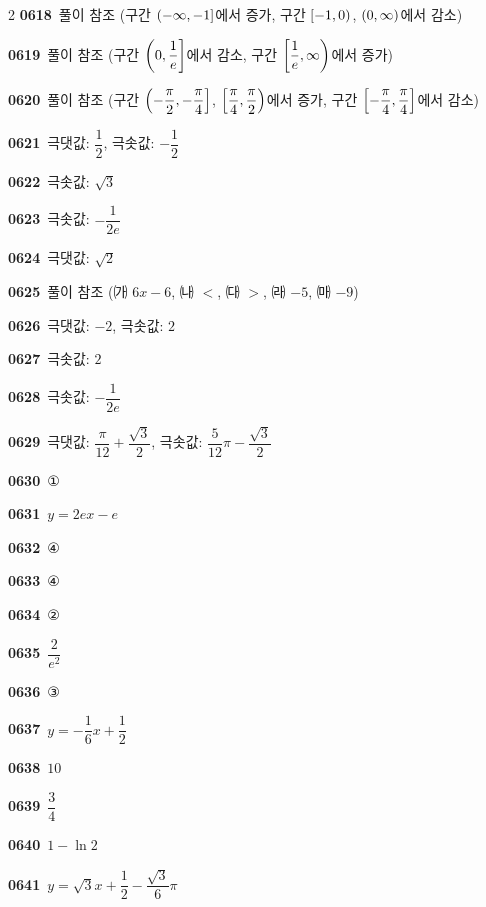 \documentclass[10pt,a4paper]{article}
\begin{document}
\begin{multicols}{2}
\noindent\textbf{0618}\ 풀이 참조 (구간 $(-\infty{,}\mkern3mu\mathopen{}-1]$에서 증가, 구간 $[-1{,}\mkern3mu\mathopen{}0)$, $(0{,}\mkern3mu\mathopen{}\infty)$에서 감소)\par
\noindent\textbf{0619}\ 풀이 참조 (구간 $\left(0{,}\mkern3mu\mathopen{}\dfrac{1}{e}\right]$에서 감소, 구간 $\left[\dfrac{1}{e}{,}\mkern3mu\mathopen{}\infty\right)$에서 증가)\par
\noindent\textbf{0620}\ 풀이 참조 (구간 $\left(-\dfrac{\pi}{2}{,}\mkern3mu\mathopen{}-\dfrac{\pi}{4}\right]$, $\left[\dfrac{\pi}{4}{,}\mkern3mu\mathopen{}\dfrac{\pi}{2}\right)$에서 증가, 구간 $\left[-\dfrac{\pi}{4}{,}\mkern3mu\mathopen{}\dfrac{\pi}{4}\right]$에서 감소)\par
\noindent\textbf{0621}\ 극댓값: $\dfrac{1}{2}$, 극솟값: $-\dfrac{1}{2}$\par
\noindent\textbf{0622}\ 극솟값: $\sqrt{3}$\par
\noindent\textbf{0623}\ 극솟값: $-\dfrac{1}{2e}$\par
\noindent\textbf{0624}\ 극댓값: $\sqrt{2}$\par
\noindent\textbf{0625}\ 풀이 참조 (㈎ $6x-6$, ㈏ $<$, ㈐ $>$, ㈑ $-5$, ㈒ $-9$)\par
\noindent\textbf{0626}\ 극댓값: $-2$, 극솟값: $2$\par
\noindent\textbf{0627}\ 극솟값: $2$\par
\noindent\textbf{0628}\ 극솟값: $-\dfrac{1}{2e}$\par
\noindent\textbf{0629}\ 극댓값: $\dfrac{\pi}{12}+\dfrac{\sqrt{3}}{2}$, 극솟값: $\dfrac{5}{12}\pi-\dfrac{\sqrt{3}}{2}$\par
\noindent\textbf{0630}\ ①\par
\noindent\textbf{0631}\ $y=2ex-e$\par
\noindent\textbf{0632}\ ④\par
\noindent\textbf{0633}\ ④\par
\noindent\textbf{0634}\ ②\par
\noindent\textbf{0635}\ $\dfrac{2}{e^2}$\par
\noindent\textbf{0636}\ ③\par
\noindent\textbf{0637}\ $y=-\dfrac{1}{6}x+\dfrac{1}{2}$\par
\noindent\textbf{0638}\ $10$\par
\noindent\textbf{0639}\ $\dfrac{3}{4}$\par
\noindent\textbf{0640}\ $1-\ln 2$\par
\noindent\textbf{0641}\ $y=\sqrt{3}x+\dfrac{1}{2}-\dfrac{\sqrt{3}}{6}\pi$\par

\end{multicols}
\end{document}
